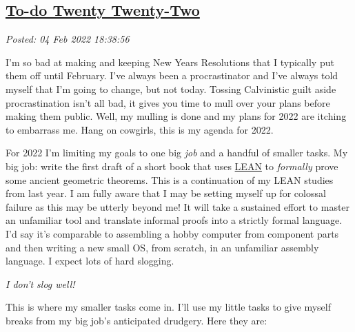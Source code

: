 %

\subsection*{\href{http://analyzethedatanotthedrivel.org/2022/02/04/to-do-twenty-twenty-two/}{To-do Twenty Twenty-Two}}


\noindent\emph{Posted: 04 Feb 2022 18:38:56}
\vspace{6pt}

I'm so bad at making and keeping New Years Resolutions that I typically
put them off until February. I've always been a procrastinator and I've
always told myself that I'm going to change, but not today. Tossing
Calvinistic guilt aside procrastination isn't all bad, it gives you time
to mull over your plans before making them public. Well, my mulling is
done and my plans for 2022 are itching to embarrass me. Hang on
cowgirls, this is my agenda for 2022.

For 2022 I'm limiting my goals to one big \emph{job} and a handful of
smaller tasks. My big job: write the first draft of a short book that
uses \href{https://leanprover-community.github.io/}{LEAN} to
\emph{formally} prove some ancient geometric theorems. This is a
continuation of my LEAN studies from last year. I am fully aware that I
may be setting myself up for colossal failure as this may be utterly
beyond me! It will take a sustained effort to master an unfamiliar tool
and translate informal proofs into a strictly formal language. I'd say
it's comparable to assembling a hobby computer from component parts and
then writing a new small OS, from scratch, in an unfamiliar assembly
language. I expect lots of hard slogging.

\emph{I don't slog well!}

This is where my smaller tasks come in. I'll use my little tasks to give
myself breaks from my big job's anticipated drudgery. Here they are:

